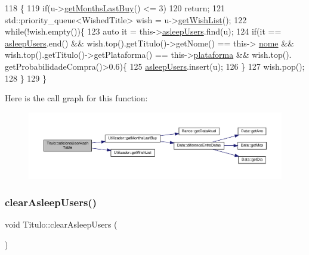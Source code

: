 \begin{DoxyCode}
118                                                 \{
119      \textcolor{keywordflow}{if}(u->\hyperlink{classUtilizador_a8c4c3275a56142c31f19c7af78e3c88f}{getMonthsLastBuy}() <= 3)
120          \textcolor{keywordflow}{return};
121      std::priority\_queue<WishedTitle> wish = u->\hyperlink{classUtilizador_a8624e9e45e13e592e68164b0d7b2b7cd}{getWishList}();
122      \textcolor{keywordflow}{while}(!wish.empty())\{
123          \textcolor{keyword}{auto} it = this->\hyperlink{classTitulo_a84e7b9dc58fbba5f048a57a0878a43e8}{asleepUsers}.find(u);
124          \textcolor{keywordflow}{if}(it == \hyperlink{classTitulo_a84e7b9dc58fbba5f048a57a0878a43e8}{asleepUsers}.end() && wish.top().getTitulo()->getNome() == this->
      \hyperlink{classTitulo_a8abdf1fc6d4fc14be20bbec247664d83}{nome} && wish.top().getTitulo()->getPlataforma() == this->\hyperlink{classTitulo_a67761eb7f006453ab0869e4b7c0a9c0b}{plataforma} && wish.top().
      getProbabilidadeCompra()>0.6)\{
125              \hyperlink{classTitulo_a84e7b9dc58fbba5f048a57a0878a43e8}{asleepUsers}.insert(u);
126          \}
127          wish.pop();
128      \}
129  \}
\end{DoxyCode}
Here is the call graph for this function\+:
\nopagebreak
\begin{figure}[H]
\begin{center}
\leavevmode
\includegraphics[width=350pt]{classTitulo_a64300cd5c0c717f77666413127404d36_cgraph}
\end{center}
\end{figure}
\mbox{\label{classTitulo_aa3c77caaee860b214308cf0d2944b835}} 
\subsubsection{\texorpdfstring{clear\+Asleep\+Users()}{clearAsleepUsers()}}
{\footnotesize\ttfamily void Titulo\+::clear\+Asleep\+Users (\begin{DoxyParamCaption}{ }\end{DoxyParamCaption})\hspace{0.3cm}{\ttfamily [inline]}}



